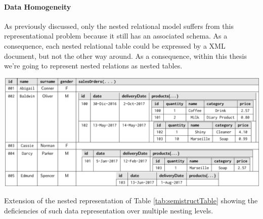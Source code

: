 \paragraph*{Data Homogeneity} As previously discussed, only the nested relational model suffers from this representational problem because it still has an associated schema. As a consequence, each nested relational table could be expressed by a XML document, but not the other way around. As a consequence, within this thesis we're going to represent nested relations as nested tables.


\begin{table}[!t]
\centering
\includegraphics[scale=0.7]{fig/02models/02nestedaggrSales.pdf}
\caption{Extension of the nested representation of Table \ref{tab:semistructTable}  showing the deficiencies of such data representation over multiple nesting levels.}
\label{tab:semistructTableMultipleNest}
\end{table}
